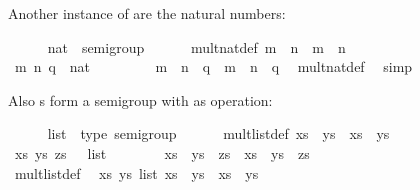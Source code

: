\begin{isabellebody}
\begin{isamarkuptext}
  Another instance of  are the natural numbers:%
\end{isamarkuptext}%
\isamarkuptrue%
\ \ \ \ \isamarkupfalse%
\ nat\ {\isacharcolon}{\isacharcolon}\ semigroup\isanewline
\ \ \ \ \ \ mult{\isacharunderscore}nat{\isacharunderscore}def{\isacharcolon}\ {\isachardoublequoteopen}m\ {\isasymotimes}\ n\ {\isasymequiv}\ m\ {\isacharplus}\ n{\isachardoublequoteclose}\isanewline
%
\isadelimproof
\ \ \ \ %
\endisadelimproof
%
\isatagproof
{}\isamarkupfalse%
\isanewline
\ \ \ \ \ \ \isamarkupfalse%
\ m\ n\ q\ {\isacharcolon}{\isacharcolon}\ nat\ \isanewline
\ \ \ \ \ \ \isamarkupfalse%
\ {\isachardoublequoteopen}m\ {\isasymotimes}\ n\ {\isasymotimes}\ q\ {\isacharequal}\ m\ {\isasymotimes}\ {\isacharparenleft}n\ {\isasymotimes}\ q{\isacharparenright}{\isachardoublequoteclose}\ \isamarkupfalse%
\ mult{\isacharunderscore}nat{\isacharunderscore}def\ \isamarkupfalse%
\ simp\isanewline
\ \ \ \ \isamarkupfalse%
%
\endisatagproof
{\isafoldproof}%
%
\isadelimproof
%
\endisadelimproof
%
\begin{isamarkuptext}%
Also s form a semigroup with  as
  operation:%
\end{isamarkuptext}%
\isamarkuptrue%
\ \ \ \ \isamarkupfalse%
\ list\ {\isacharcolon}{\isacharcolon}\ {\isacharparenleft}type{\isacharparenright}\ semigroup\isanewline
\ \ \ \ \ \ mult{\isacharunderscore}list{\isacharunderscore}def{\isacharcolon}\ {\isachardoublequoteopen}xs\ {\isasymotimes}\ ys\ {\isasymequiv}\ xs\ {\isacharat}\ ys{\isachardoublequoteclose}\isanewline
%
\isadelimproof
\ \ \ \ %
\endisadelimproof
%
\isatagproof
{}\isamarkupfalse%
\isanewline
\ \ \ \ \ \ \isamarkupfalse%
\ xs\ ys\ zs\ {\isacharcolon}{\isacharcolon}\ {\isachardoublequoteopen}{\isasymalpha}\ list{\isachardoublequoteclose}\isanewline
\ \ \ \ \ \ \isamarkupfalse%
\ {\isachardoublequoteopen}xs\ {\isasymotimes}\ ys\ {\isasymotimes}\ zs\ {\isacharequal}\ xs\ {\isasymotimes}\ {\isacharparenleft}ys\ {\isasymotimes}\ zs{\isacharparenright}{\isachardoublequoteclose}\isanewline
\ \ \ \ \ \ \isamarkupfalse%
\ {\isacharminus}\isanewline
\ \ \ \ \ \ \ \ \isamarkupfalse%
\ mult{\isacharunderscore}list{\isacharunderscore}def\ \isamarkupfalse%
\ {\isachardoublequoteopen}{\isasymAnd}xs\ ys{\isasymColon}{\isasymalpha}\ list{\isachardot}\ xs\ {\isasymotimes}\ ys\ {\isasymequiv}\ xs\ {\isacharat}\ ys{\isachardoublequoteclose}\ \isacommand{{\isachardot}}\isamarkupfalse%

\end{isabellebody}
